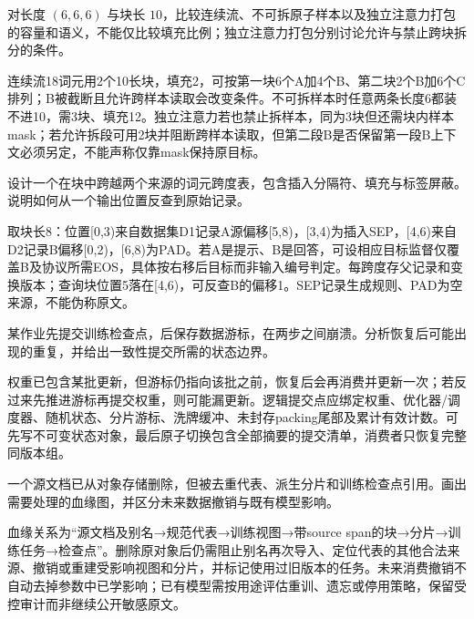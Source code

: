 \begin{exercises}
\begin{exercise} 对长度 $(6,6,6)$ 与块长 $10$，比较连续流、不可拆原子样本以及独立注意力打包的容量和语义，不能仅比较填充比例；独立注意力打包分别讨论允许与禁止跨块拆分的条件。

\begin{solution}
连续流18词元用2个10长块，填充2，可按第一块6个A加4个B、第二块2个B加6个C排列；B被截断且允许跨样本读取会改变条件。不可拆样本时任意两条长度6都装不进10，需3块、填充12。独立注意力若也禁止拆样本，同为3块但还需块内样本mask；若允许拆段可用2块并阻断跨样本读取，但第二段B是否保留第一段B上下文必须另定，不能声称仅靠mask保持原目标。
\end{solution}
\end{exercise}

\begin{exercise} 设计一个在块中跨越两个来源的词元跨度表，包含插入分隔符、填充与标签屏蔽。说明如何从一个输出位置反查到原始记录。

\begin{solution}
取块长8：位置[0,3)来自数据集D1记录A源偏移[5,8)，[3,4)为插入SEP，[4,6)来自D2记录B偏移[0,2)，[6,8)为PAD。若A是提示、B是回答，可设相应目标监督仅覆盖B及协议所需EOS，具体按右移后目标而非输入编号判定。每跨度存父记录和变换版本；查询块位置5落在[4,6)，可反查B的偏移1。SEP记录生成规则、PAD为空来源，不能伪称原文。
\end{solution}
\end{exercise}

\begin{exercise} 某作业先提交训练检查点，后保存数据游标，在两步之间崩溃。分析恢复后可能出现的重复，并给出一致性提交所需的状态边界。

\begin{solution}
权重已包含某批更新，但游标仍指向该批之前，恢复后会再消费并更新一次；若反过来先推进游标再提交权重，则可能漏更新。逻辑提交点应绑定权重、优化器/调度器、随机状态、分片游标、洗牌缓冲、未封存packing尾部及累计有效计数。可先写不可变状态对象，最后原子切换包含全部摘要的提交清单，消费者只恢复完整同版本组。
\end{solution}
\end{exercise}

\begin{exercise} 一个源文档已从对象存储删除，但被去重代表、派生分片和训练检查点引用。画出需要处理的血缘图，并区分未来数据撤销与既有模型影响。

\begin{solution}
血缘关系为“源文档及别名→规范代表→训练视图→带source span的块→分片→训练任务→检查点”。删除原对象后仍需阻止别名再次导入、定位代表的其他合法来源、撤销或重建受影响视图和分片，并标记使用过旧版本的任务。未来消费撤销不自动去掉参数中已学影响；已有模型需按用途评估重训、遗忘或停用策略，保留受控审计而非继续公开敏感原文。
\end{solution}
\end{exercise}

\end{exercises}
